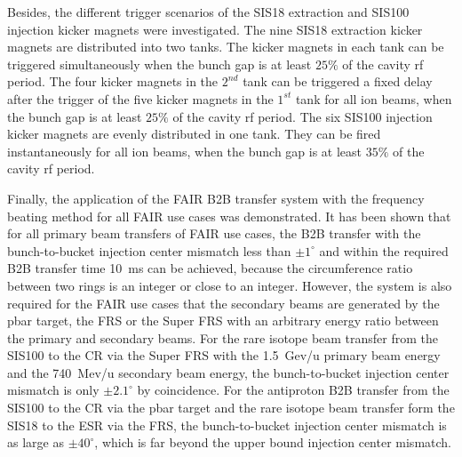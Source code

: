 Besides, the different trigger scenarios of the SIS18 extraction and SIS100 injection kicker magnets were investigated. The nine SIS18 extraction kicker magnets are distributed into two tanks. The kicker magnets in each tank can be triggered simultaneously when the bunch gap is at least $25\%$ of the cavity rf period. The four kicker magnets in the $2^{nd}$ tank can be triggered a fixed delay after the trigger of the five kicker magnets in the $1^{st}$ tank for all ion beams, when the bunch gap is at least $25\%$ of the cavity rf period. The six SIS100 injection kicker magnets are evenly distributed in one tank. They can be fired instantaneously for all ion beams, when the bunch gap is at least $35\%$ of the cavity rf period.

Finally, the application of the FAIR B2B transfer system with the frequency beating method for all FAIR use cases was demonstrated. It has been shown that for all primary beam transfers of FAIR use cases, the B2B transfer with the bunch-to-bucket injection center mismatch less than $\pm1^\circ$ and within the required B2B transfer time \SI{10}{\ms} can be achieved, because the circumference ratio between two rings is an integer or close to an integer. However, the system is also required for the FAIR use cases that the secondary beams are generated by the pbar target, the FRS or the Super FRS with an arbitrary energy ratio between the primary and secondary beams. For the rare isotope beam transfer from the SIS100 to the CR via the Super FRS with the \SI{1.5}{Gev/u} primary beam energy and the \SI{740}{Mev/u} secondary beam energy, the bunch-to-bucket injection center mismatch is only $\pm2.1^\circ$ by coincidence. For the antiproton B2B transfer from the SIS100 to the CR via the pbar target and the rare isotope beam transfer form the SIS18 to the ESR via the FRS, the bunch-to-bucket injection center mismatch is as large as $\pm40^\circ$, which is far beyond the upper bound injection center mismatch.

